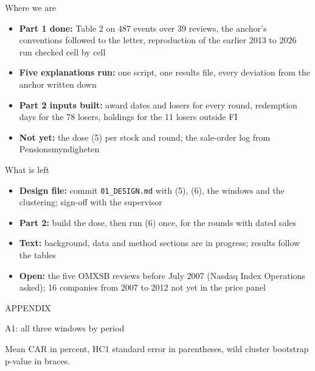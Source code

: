 \documentclass[aspectratio=169]{beamer}
\begin{document}
\begin{frame}{Where we are}
  \begin{itemize}
    \item \textbf{Part 1 done:} Table 2 on 487 events over 39 reviews, the anchor's
      conventions followed to the letter, reproduction of the earlier 2013 to 2026
      run checked cell by cell
    \item \textbf{Five explanations run:} one script, one results file, every
      deviation from the anchor written down
    \item \textbf{Part 2 inputs built:} award dates and losers for every round,
      redemption days for the 78 losers, holdings for the 11 losers outside FI
    \item \textbf{Not yet:} the dose (5) per stock and round; the sale-order log from
      Pensionsmyndigheten
  \end{itemize}
\end{frame}

\begin{frame}{What is left}
  \begin{itemize}
    \item \textbf{Design file:} commit \texttt{01\_DESIGN.md} with (5), (6), the windows
      and the clustering; sign-off with the supervisor
    \item \textbf{Part 2:} build the dose, then run (6) once, for the rounds with dated
      sales
    \item \textbf{Text:} background, data and method sections are in progress;
      results follow the tables
    \item \textbf{Open:} the five OMXSB reviews before July 2007 (Nasdaq Index
      Operations asked); 16 companies from 2007 to 2012 not yet in the price panel
  \end{itemize}
\end{frame}

\appendix
{}
\begin{frame}[plain]
  \centering\LARGE APPENDIX
\end{frame}

\begin{frame}{A1: all three windows by period}
  \centering\tiny
  

  \medskip\raggedright
  Mean CAR in percent, HC1 standard error in parentheses, wild cluster bootstrap p-value in braces.
\end{frame}
\end{document}
